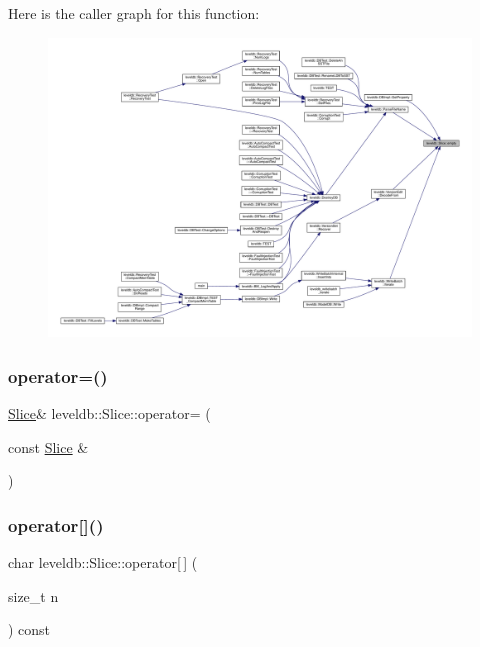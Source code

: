 Here is the caller graph for this function\+:
\nopagebreak
\begin{figure}[H]
\begin{center}
\leavevmode
\includegraphics[width=350pt]{classleveldb_1_1_slice_a56ac7a70125c26187ecf4dd040004582_icgraph}
\end{center}
\end{figure}
\mbox{\label{classleveldb_1_1_slice_aed082a8f2d4a877058f5bac84effaac1}} 
\subsubsection{\texorpdfstring{operator=()}{operator=()}}
{\footnotesize\ttfamily \mbox{\hyperlink{classleveldb_1_1_slice}{Slice}}\& leveldb\+::\+Slice\+::operator= (\begin{DoxyParamCaption}\item[{const \mbox{\hyperlink{classleveldb_1_1_slice}{Slice}} \&}]{ }\end{DoxyParamCaption})\hspace{0.3cm}{\ttfamily [default]}}

\mbox{\label{classleveldb_1_1_slice_aea62da83ffa80f22e065b15ca8596726}} 
\subsubsection{\texorpdfstring{operator[]()}{operator[]()}}
{\footnotesize\ttfamily char leveldb\+::\+Slice\+::operator\mbox{[}$\,$\mbox{]} (\begin{DoxyParamCaption}\item[{size\+\_\+t}]{n }\end{DoxyParamCaption}) const\hspace{0.3cm}{\ttfamily [inline]}}

